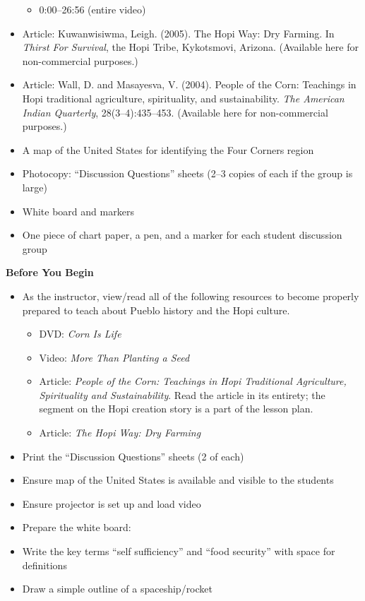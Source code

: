 \documentclass[12pt,]{article}
\providecommand{\tightlist}{%
  \setlength{\itemsep}{0pt}\setlength{\parskip}{0pt}}
\begin{document}
\begin{itemize}
  \begin{itemize}
  \tightlist
  \item
    0:00--26:56 (entire video)
  \end{itemize}
\item
  Article: Kuwanwisiwma, Leigh. (2005). The Hopi Way: Dry Farming. In
  \emph{Thirst For Survival}, the Hopi Tribe, Kykotsmovi, Arizona.
  (Available here for non-commercial purposes.)
\item
  Article: Wall, D. and Masayesva, V. (2004). People of the Corn:
  Teachings in Hopi traditional agriculture, spirituality, and
  sustainability. \emph{The American Indian Quarterly}, 28(3--4):435--453.
  (Available here for non-commercial
  purposes.)
\item
  A map of the United States for identifying the Four Corners region
\item
  Photocopy: ``Discussion Questions'' sheets (2--3 copies of each if the
  group is large)
\item
  White board and markers
\item
  One piece of chart paper, a pen, and a marker for each student
  discussion group
\end{itemize}

\textbf{Before You Begin}

\begin{itemize}
\tightlist
\item
  As the instructor, view/read all of the following resources to
  become properly prepared to teach about Pueblo history and the Hopi
  culture.

  \begin{itemize}
  \tightlist
  \item
    DVD: \emph{Corn Is Life}
  \item
    Video: \emph{More Than Planting a Seed}
  \item
    Article: \emph{People of the Corn: Teachings in Hopi Traditional
    Agriculture, Spirituality and Sustainability}. Read the
    article in its entirety; the segment on the Hopi creation
    story is a part of the lesson plan.
  \item
    Article: \emph{The Hopi Way: Dry Farming}
  \end{itemize}
\item
  Print the ``Discussion Questions'' sheets (2 of each)
\item
  Ensure map of the United States is available and visible to the
  students
\item
  Ensure projector is set up and load video
\item
  Prepare the white board:
\item
  Write the key terms ``self sufficiency'' and ``food security'' with
  space for definitions
\item
  Draw a simple outline of a spaceship/rocket
\end{itemize}
\end{document}
